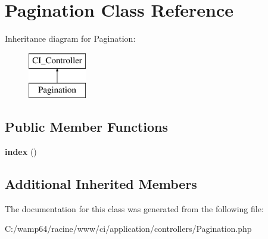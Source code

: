 \hypertarget{class_pagination}{}\section{Pagination Class Reference}
\label{class_pagination}
Inheritance diagram for Pagination\+:\begin{figure}[H]
\begin{center}
\leavevmode
\includegraphics[height=2.000000cm]{class_pagination}
\end{center}
\end{figure}
\subsection*{Public Member Functions}
\begin{DoxyCompactItemize}
\item 
\mbox{\label{class_pagination_ae4e501d9e20ab4bebd095bcd1dc2dbb2}} 
{\bfseries index} ()
\end{DoxyCompactItemize}
\subsection*{Additional Inherited Members}


The documentation for this class was generated from the following file\+:\begin{DoxyCompactItemize}
\item 
C\+:/wamp64/racine/www/ci/application/controllers/Pagination.\+php\end{DoxyCompactItemize}
